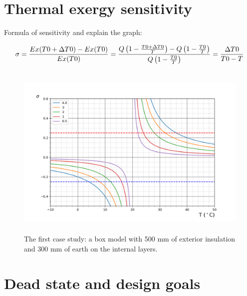 \documentclass[10pt]{extarticle} %
\begin{document}
\section{Thermal exergy sensitivity}

Formula of sensitivity and explain the graph:

\begin{equation}
\sigma =  {Ex(T0+\Delta T0)-Ex(T0) \over Ex(T0)} = { { Q \left( 1-{T0+ \Delta T0 \over T} \right) } - { Q \left( 1-{T0 \over T} \right) } \over { Q \left( 1-{T0 \over T} \right) } } = { \Delta T0 \over T0 - T }
\end{equation}

\begin{figure}[h]
 
\includegraphics[height=8.5cm, center]{images/sensitivity.png} 

\caption{The first case study: a box model with 500 mm of exterior  insulation and 300 mm of earth on the internal layers.}
\label{fig:casestudy}
\end{figure}

\vskip3cm

\section{Dead state and design goals}

\cite{Pons2019} 
\end{document}
